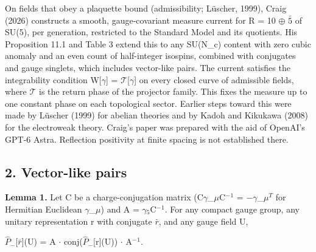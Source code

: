 \documentclass[
  11pt,
]{article}
\begin{document}
On fields that obey a plaquette bound (admissibility; Lüscher, 1999), Craig (2026) constructs a smooth, gauge-covariant measure current for R = 10 \ensuremath{\oplus} \ensuremath{\bar{5}} of SU(5), per generation, restricted to the Standard Model and its quotients. His Proposition 11.1 and Table 3 extend this to any SU(N\_c) content with zero cubic anomaly and an even count of half-integer isospins, combined with conjugates and gauge singlets, which includes vector-like pairs. The current satisfies the integrability condition W{[}\ensuremath{\gamma}{]} = \ensuremath{\mathcal{T}}{[}\ensuremath{\gamma}{]} on every closed curve of admissible fields, where \ensuremath{\mathcal{T}} is the return phase of the projector family. This fixes the measure up to one constant phase on each topological sector. Earlier steps toward this were made by Lüscher (1999) for abelian theories and by Kadoh and Kikukawa (2008) for the electroweak theory. Craig's paper was prepared with the aid of OpenAI's GPT-6 Astra. Reflection positivity at finite spacing is not established there.

\hypertarget{vector-like-pairs}{%
\subsection{2. Vector-like pairs}\label{vector-like-pairs}}

\textbf{Lemma 1.} Let C be a charge-conjugation matrix (C\ensuremath{\gamma}\_\ensuremath{\mu}C\ensuremath{^{-}}\ensuremath{^{1}} = \ensuremath{-}\ensuremath{\gamma}\_\ensuremath{\mu}\ensuremath{^{T}} for Hermitian Euclidean \ensuremath{\gamma}\_\ensuremath{\mu}) and A = \ensuremath{\gamma}\ensuremath{_{5}}C\ensuremath{^{-}}\ensuremath{^{1}}. For any compact gauge group, any unitary representation r with conjugate \ensuremath{\bar{r}}, and any gauge field U,

\ensuremath{\hat{P}}\ensuremath{_{-}}{[}\ensuremath{\bar{r}}{]}(U) = A \ensuremath{\cdot} conj(\ensuremath{\hat{P}}\ensuremath{_{-}}{[}r{]}(U)) \ensuremath{\cdot} A\ensuremath{^{-}}\ensuremath{^{1}}.
\end{document}
